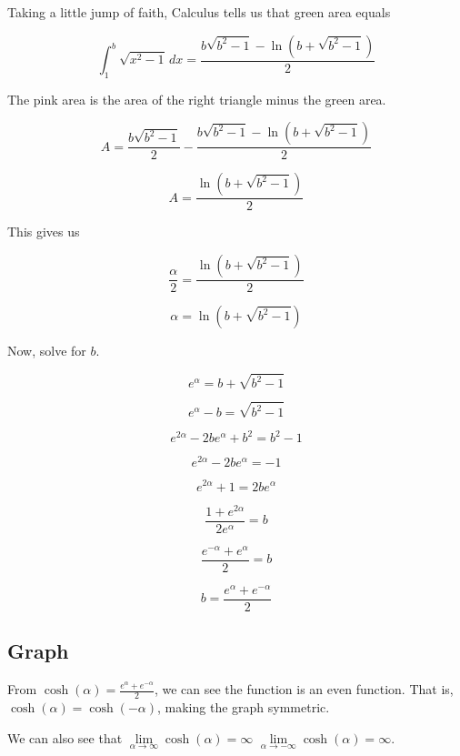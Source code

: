 \documentclass{ximera}
\begin{document}
Taking a little jump of faith, Calculus tells us that green area equals


\[      \int_1^b \sqrt{x^2-1} \, dx = \frac{b \sqrt{b^2 - 1} - \ln(b + \sqrt{b^2 - 1})}{2}           \]


The pink area is the area of the right triangle minus the green area.



\[   A = \frac{b \sqrt{b^2 - 1}}{2} -     \frac{b \sqrt{b^2 - 1} - \ln(b + \sqrt{b^2 - 1})}{2}         \]



\[    A =    \frac{\ln(b + \sqrt{b^2 - 1})}{2}     \]


This gives us 



 \[    \frac{\alpha}{2} =    \frac{\ln(b + \sqrt{b^2 - 1})}{2}     \]




 \[    \alpha  =   \ln(b + \sqrt{b^2 - 1})  \]

Now, solve for $b$.




 \[    e^{\alpha}  =   b + \sqrt{b^2 - 1}  \]


 \[    e^{\alpha} - b =   \sqrt{b^2 - 1}  \]


 \[    e^{2\alpha} - 2 b e^{\alpha}  + b^2   =   b^2 - 1  \]


 \[    e^{2\alpha} - 2 b e^{\alpha}   =    - 1  \]


 \[    e^{2\alpha} +1  =   2 b e^{\alpha}     \]


 \[    \frac{ 1 + e^{2\alpha}}{2 e^{\alpha}}  =   b    \]


 \[    \frac{ e^{-\alpha} + e^{\alpha}}{2}  =   b    \]


 \[    b = \frac{ e^{\alpha} + e^{-\alpha}}{2}    \]





\subsection{Graph}





From  $\cosh(\alpha) = \frac{ e^{\alpha} + e^{-\alpha}}{2}$, we can see the function is an even function.  That is, $\cosh(\alpha) = \cosh(-\alpha)$, making the graph symmetric.



We can also see that $\lim\limits_{\alpha \to \infty} \cosh(\alpha) = \infty$ $\lim\limits_{\alpha \to -\infty} \cosh(\alpha) = \infty$.
\end{document}
